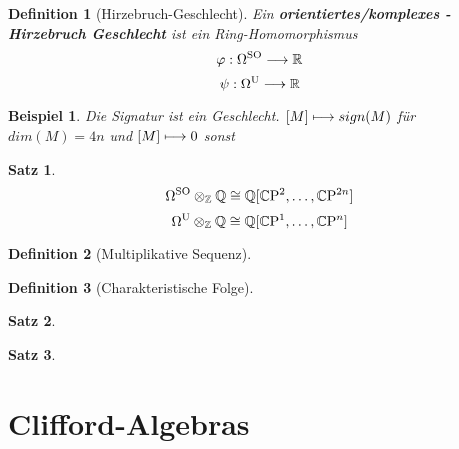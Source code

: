 \documentclass{report}
\newtheorem{Def}{Definition}[chapter]
\newtheorem{Thrm}{Satz}[chapter]
\newtheorem*{Ex}{Beispiel}
\begin{document}
\begin{Def}[Hirzebruch-Geschlecht]
Ein \textbf{orientiertes/komplexes - Hirzebruch Geschlecht} ist ein Ring-Homomorphismus
$$ \varphi: \Omega^{\mathrm{SO}} \longrightarrow \mathbb{R}$$
$$ \psi: \Omega^{\mathrm{U}} \longrightarrow \mathbb{R}$$
\end{Def}

\begin{Ex}
    Die Signatur ist ein Geschlecht.
    $[M] \longmapsto sign(M)$ für $dim(M) = 4n$ und $[M] \longmapsto 0$ sonst 
\end{Ex}

\begin{Thrm}
   $$\Omega^{\mathrm{SO}} \otimes_{\mathbb{Z}} \mathbb{Q} \cong \mathbb{Q}[\mathbb{C}\mathrm{P}^{ 2 }, \ldots, \mathbb{C}\mathrm{P}^{ 2n }]$$ 
   $$\Omega^{\mathrm{U}} \otimes_{\mathbb{Z}} \mathbb{Q} \cong \mathbb{Q}[\mathbb{C}\mathrm{P}^{ 1 }, \ldots, \mathbb{C}\mathrm{P}^{ n }]$$ 
\end{Thrm}

\begin{Def}[Multiplikative Sequenz]
    
\end{Def}

\begin{Def}[Charakteristische Folge]
    
\end{Def}

\begin{Thrm}

\end{Thrm}

\begin{Thrm}

\end{Thrm}




\chapter{Clifford-Algebras}
\end{document}
